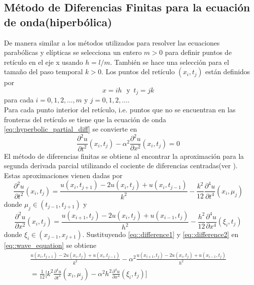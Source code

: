 \documentclass[a4paper]{article}
\begin{document}
\subsection{Método de Diferencias Finitas para la ecuación de onda(hiperbólica)}
De manera similar a los métodos utilizados para resolver las ecuaciones parabólicas y elípticas se selecciona un entero $m>0$ para definir puntos de retículo en el eje x usando $h=l/m$. También se hace una selección para el tamaño del paso temporal $k>0$. Los puntos del retículo $(x_i,t_j)$ están definidos por
\begin{equation}
x=ih\,\,\,\, \text{y} \,\,\, t_j=jk
\end{equation}
para cada $i=0,1,2,\hdots,m$ y $j=0,1,2,\hdots$.\\
Para cada punto interior del retículo, i.e. puntos que no se encuentran en las fronteras del retículo se tiene que la ecuación de onda \ref{eq::hyperbolic_partial_diff} se convierte en 
\begin{equation}\label{eq::wave_equation}
\frac{\partial^2 u}{\partial t^2}(x_i,t_j) - \alpha^2 \frac{\partial^2 u}{\partial x^2}(x_i,t_j)=0
\end{equation}
El método de diferencias finitas se obtiene al encontrar la aproximación para la segunda derivada parcial utilizando el cociente de diferencias centradas(ver \cite{Burden}). Estas aproximaciones vienen dadas por
\begin{equation}\label{eq::difference1}
\frac{\partial ^2 u}{\partial t^2}(x_i,t_j)=\frac{u(x_i,t_{j+1})-2u(x_i,t_j)+u(x_i,t_{j-1})}{k^2}-\frac{k^2}{12}\frac{\partial^4 u}{\partial t ^4}(x_i,\mu_j)
\end{equation}
donde $\mu_j \in (t_{j-1},t_{j+1})$ y
\begin{equation}\label{eq::difference2}
\frac{\partial ^2 u}{\partial x^2}(x_i,t_j)=\frac{u(x_{i+1},t_{j})-2u(x_i,t_j)+u(x_{i-1},t_{j})}{h^2}-\frac{h^2}{12}\frac{\partial^4 u}{\partial x ^4}(\xi_i,t_j)
\end{equation}
donde $\xi_i \in (x_{j-1},x_{j+1})$. Sustituyendo \ref{eq::difference1} y \ref{eq::difference2} en \ref{eq::wave_equation} se obtiene
\begin{equation}
\begin{aligned}
\frac{u(x_i,t_{j+1})-2u(x_i,t_j)+u(x_i,t_{j-1})}{k^2}-\alpha^2 \frac{u(x_{i+1},t_{j})-2u(x_i,t_j)+u(x_{i-1},t_{j})}{h^2}\\
=\frac{1}{12}\Bigg[ k^2 \frac{\partial^4 u}{\partial t ^4}(x_i,\mu_j) -\alpha^2 h^2 \frac{\partial^4 u}{\partial x ^4}(\xi_i,t_j)  \Bigg]
\end{aligned}
\end{equation}
\end{document}
